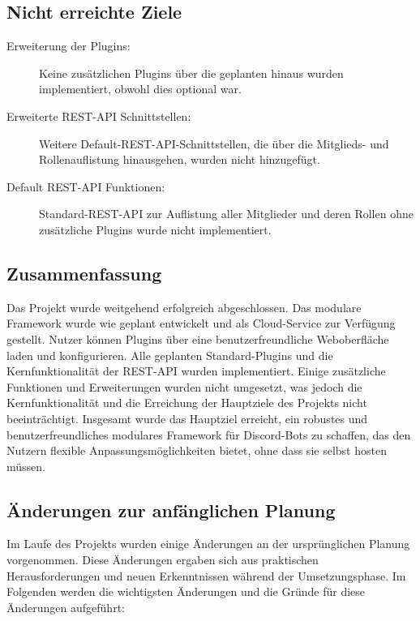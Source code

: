 \subsection*{Nicht erreichte Ziele}

\begin{description}
    \item[Erweiterung der Plugins:] Keine zusätzlichen Plugins über die geplanten hinaus wurden implementiert, obwohl dies optional war.
    \item[Erweiterte REST-API Schnittstellen:] Weitere Default-REST-API-Schnittstellen, die über die Mitglieds- und Rollenauflistung hinausgehen, wurden nicht hinzugefügt.
    \item[Default REST-API Funktionen:] Standard-REST-API zur Auflistung aller Mitglieder und deren Rollen ohne zusätzliche Plugins wurde nicht implementiert.
\end{description}

\subsection*{Zusammenfassung}

Das Projekt wurde weitgehend erfolgreich abgeschlossen. Das modulare Framework wurde wie geplant entwickelt und als Cloud-Service zur Verfügung gestellt. Nutzer können Plugins über eine benutzerfreundliche Weboberfläche laden und konfigurieren. Alle geplanten Standard-Plugins und die Kernfunktionalität der REST-API wurden implementiert. Einige zusätzliche Funktionen und Erweiterungen wurden nicht umgesetzt, was jedoch die Kernfunktionalität und die Erreichung der Hauptziele des Projekts nicht beeinträchtigt. Insgesamt wurde das Hauptziel erreicht, ein robustes und benutzerfreundliches modulares Framework für Discord-Bots zu schaffen, das den Nutzern flexible Anpassungsmöglichkeiten bietet, ohne dass sie selbst hosten müssen.

\subsection{Änderungen zur anfänglichen Planung}\label{aenderungen-zur-anfaenglichen-planung}

Im Laufe des Projekts wurden einige Änderungen an der ursprünglichen Planung vorgenommen. Diese Änderungen ergaben sich aus praktischen Herausforderungen und neuen Erkenntnissen während der Umsetzungsphase. Im Folgenden werden die wichtigsten Änderungen und die Gründe für diese Änderungen aufgeführt:

